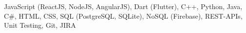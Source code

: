 JavaScript (ReactJS, NodeJS, AngularJS), Dart (Flutter), C++, Python, Java, C\#, HTML, CSS, SQL (PostgreSQL, SQLite), NoSQL (Firebase), REST-APIs, Unit Testing, Git, JIRA
